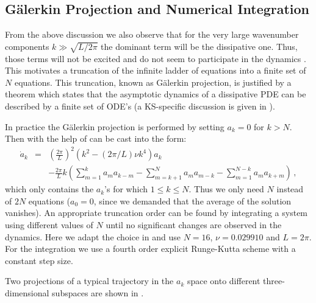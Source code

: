 \documentclass[pre,preprint,groupedaddress,showpacs,showkeys]{revtex4}
\begin{document}
\subsection{G\"{a}lerkin Projection and Numerical Integration}
\label{sec:truncation}

 From the above discussion we also observe that for the very large
 wavenumber components $k\gg\sqrt{L/2\pi}$  the dominant term will be
 the dissipative one. Thus, those terms will not be
 excited and do not seem to participate in the dynamics %
 .
 This motivates a truncation of the infinite ladder of equations
  into a finite set of $N$ equations. This
 truncation, known as G\"{a}lerkin projection, is justified by a theorem
 which states that the asymptotic dynamics of a dissipative PDE can
 be described by a finite set of ODE's (a KS-specific discussion is
 given in \cite{Foias:88}).

 In practice the G\"{a}lerkin projection is performed by setting $a_k=0$ for
 $k>N$. Then  with the help of 
 can be cast into the form:
 \begin{eqnarray}
  \dot{a}_k & = & \left(\frac{2\pi}{L}\right)^2\left(k^2- \left(2\pi/L\right)\nu k^4\right)a_k  \nonumber \\
            &  & - \frac{2\pi}{L} k\left( \sum_{m=1}^{k}a_m a_{k-m}-\sum_{m=k+1}^{N}a_m a_{m-k}
                    -\sum_{m=1}^{N-k}a_m a_{k+m}\right) \, ,
  \label{eq:Fcoef Trunc}
 \end{eqnarray}
 which only contains the $a_k$'s for which $1 \leq k \leq N$. Thus we only need $N$
 instead of $2N$ equations ($a_0=0$, since we demanded that the average of the solution
 vanishes). An appropriate truncation order can be found by integrating
 a system using different values of $N$ until no significant changes
 are observed in the dynamics. Here we adapt the choice in
 \cite{Christiansen:97} and use $N=16$,
 $\nu=0.029910$ and $L=2\pi$. For the integration we use a fourth
 order explicit Runge-Kutta scheme with a constant step size.

 Two projections of a typical trajectory in the $a_k$ space onto different three-dimensional
 subspaces are shown in  .
\end{document}
